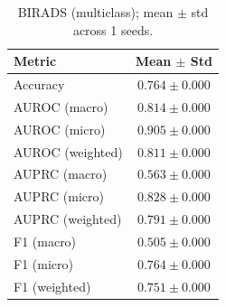 \begin{table}[h]
\centering
\begin{tabular}{l|c}
\hline
Metric & Mean $\pm$ Std \\
\hline
Accuracy & $0.764 \pm 0.000$ \\
AUROC (macro) & $0.814 \pm 0.000$ \\
AUROC (micro) & $0.905 \pm 0.000$ \\
AUROC (weighted) & $0.811 \pm 0.000$ \\
AUPRC (macro) & $0.563 \pm 0.000$ \\
AUPRC (micro) & $0.828 \pm 0.000$ \\
AUPRC (weighted) & $0.791 \pm 0.000$ \\
F1 (macro) & $0.505 \pm 0.000$ \\
F1 (micro) & $0.764 \pm 0.000$ \\
F1 (weighted) & $0.751 \pm 0.000$ \\
\hline
\end{tabular}
\caption{BIRADS (multiclass); mean $\pm$ std across 1 seeds.}
\end{table}
